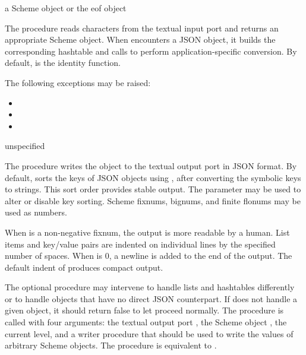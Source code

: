 \begin{procedure}
\end{procedure}
\returns{} a Scheme object or the eof object

The  procedure reads characters from the textual
input port  and returns an appropriate Scheme object.
When  encounters a JSON object, it builds
the corresponding hashtable and calls 
to perform application-specific conversion.
By default,  is the identity function.

The following exceptions may be raised:
\begin{itemize}
\item {}
\item {}
\item {}
\end{itemize}

\begin{procedure}
\end{procedure}
\returns{} unspecified

The  procedure writes the object  to the
textual output port  in JSON format. By default, 
sorts the keys of JSON objects using , after converting
the symbolic keys to strings.
This sort order provides stable output.
The  parameter may be used to alter or disable key sorting.
Scheme fixnums, bignums, and finite flonums may
be used as numbers.

When  is a non-negative fixnum, the output is more
readable by a human. List items and key/value pairs are indented on
individual lines by the specified number of spaces. When 
is 0, a newline is added to the end of the output. The default indent
of  produces compact output.

The optional  procedure may intervene to handle
lists and hashtables differently or to handle objects that have no
direct JSON counterpart.  If  does not handle a
given object, it should return false to let  proceed
normally.  The  procedure is called with four
arguments: the textual output port , the Scheme object
, the current  level, and a writer procedure
 that should be used to write the values of arbitrary Scheme
objects.  The  procedure is equivalent to
.

